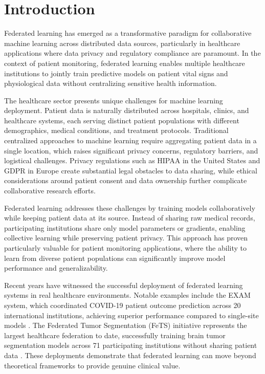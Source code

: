 \documentclass[3p,times,procedia]{elsarticle}
\begin{document}


\section{Introduction}

Federated learning has emerged as a transformative paradigm for collaborative machine learning across distributed data sources, particularly in healthcare applications where data privacy and regulatory compliance are paramount. In the context of patient monitoring, federated learning enables multiple healthcare institutions to jointly train predictive models on patient vital signs and physiological data without centralizing sensitive health information.

The healthcare sector presents unique challenges for machine learning deployment. Patient data is naturally distributed across hospitals, clinics, and healthcare systems, each serving distinct patient populations with different demographics, medical conditions, and treatment protocols. Traditional centralized approaches to machine learning require aggregating patient data in a single location, which raises significant privacy concerns, regulatory barriers, and logistical challenges. Privacy regulations such as HIPAA in the United States and GDPR in Europe create substantial legal obstacles to data sharing, while ethical considerations around patient consent and data ownership further complicate collaborative research efforts.

Federated learning addresses these challenges by training models collaboratively while keeping patient data at its source. Instead of sharing raw medical records, participating institutions share only model parameters or gradients, enabling collective learning while preserving patient privacy. This approach has proven particularly valuable for patient monitoring applications, where the ability to learn from diverse patient populations can significantly improve model performance and generalizability.

Recent years have witnessed the successful deployment of federated learning systems in real healthcare environments. Notable examples include the EXAM system, which coordinated COVID-19 patient outcome prediction across 20 international institutions, achieving superior performance compared to single-site models \cite{Dayan2021}. The Federated Tumor Segmentation (FeTS) initiative represents the largest healthcare federation to date, successfully training brain tumor segmentation models across 71 participating institutions without sharing patient data \cite{Baid2021, Pati2021}. These deployments demonstrate that federated learning can move beyond theoretical frameworks to provide genuine clinical value.
\end{document}
